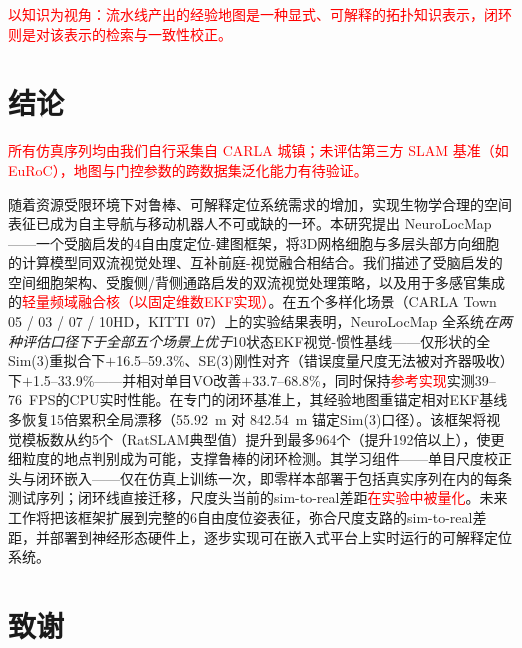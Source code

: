 \documentclass[review,12pt]{elsarticle}
\begin{document}
\textcolor{red}{以知识为视角：流水线产出的经验地图是一种显式、可解释的拓扑知识表示，闭环则是对该表示的检索与一致性校正。}












\section{结论}
\label{sec:conclusion}

\textcolor{red}{所有仿真序列均由我们自行采集自 CARLA 城镇；未评估第三方 SLAM 基准（如 EuRoC），地图与门控参数的跨数据集泛化能力有待验证。}

随着资源受限环境下对鲁棒、可解释定位系统需求的增加，实现生物学合理的空间表征已成为自主导航与移动机器人不可或缺的一环。本研究提出 NeuroLocMap——一个受脑启发的4自由度定位-建图框架，将3D网格细胞与多层头部方向细胞的计算模型同双流视觉处理、互补前庭-视觉融合相结合。我们描述了受脑启发的空间细胞架构、受腹侧/背侧通路启发的双流视觉处理策略，以及用于多感官集成的\textcolor{red}{轻量频域融合核（以固定维数EKF实现）}。在五个多样化场景（CARLA Town 05 / 03 / 07 / 10HD，KITTI~07）上的实验结果表明，NeuroLocMap 全系统\emph{在两种评估口径下于全部五个场景上优于}10状态EKF视觉-惯性基线——仅形状的全Sim(3)重拟合下$+$16.5--59.3\%、SE(3)刚性对齐（错误度量尺度无法被对齐器吸收）下$+$1.5--33.9\%——并相对单目VO改善$+$33.7--68.8\%，同时保持\textcolor{red}{参考实现}实测39--76~FPS的CPU实时性能。在专门的闭环基准上，其经验地图重锚定相对EKF基线多恢复15倍累积全局漂移（55.92~m 对 842.54~m 锚定Sim(3)口径）。该框架将视觉模板数从约5个（RatSLAM典型值）提升到最多964个（提升192倍以上），使更细粒度的地点判别成为可能，支撑鲁棒的闭环检测。其学习组件——单目尺度校正头与闭环嵌入——仅在仿真上训练一次，即零样本部署于包括真实序列在内的每条测试序列；闭环线直接迁移，尺度头当前的sim-to-real差距\textcolor{red}{在实验中被量化}。未来工作将把该框架扩展到完整的6自由度位姿表征，弥合尺度支路的sim-to-real差距，并部署到神经形态硬件上，逐步实现可在嵌入式平台上实时运行的可解释定位系统。

\section*{致谢}
\end{document}
